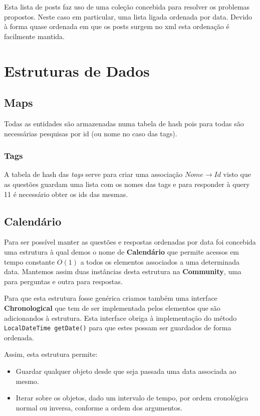 \documentclass[10pt,a4paper]{report}
\begin{document}
    Esta lista de posts faz uso de uma coleção concebida para resolver os 
    problemas propostos. Neste caso em particular, uma lista ligada ordenada 
    por data. Devido à forma quase ordenada em que os posts surgem no xml esta
    ordenação é facilmente mantida.


\chapter{Estruturas de Dados}
    \section{Maps}
        Todas as entidades são armazenadas numa tabela de hash pois para todas
        são necessárias pesquisas por id (ou nome no caso das tags).

        \subsection{Tags}
        A tabela de hash das \textit{tags} serve para criar uma associação
        $Nome \to Id$ visto que as questões guardam uma lista com os nomes das
        tags e para responder à query 11 é necessário obter os ids das mesmas.

    \section{Calendário}
        Para ser possível manter as questões e respostas ordenadas por data foi
        concebida uma estrutura à qual demos o nome de \textbf{Calendário} que
        permite acessos em tempo constante $O(1)$ a todos os elementos
        associados a uma determinada data. Mantemos assim duas instâncias desta 
        estrutura na \textbf{Community}, uma para perguntas e outra para respostas.

        Para que esta estrutura fosse genérica criamos também uma interface
        \textbf{Chronological} que tem de ser implementada pelos elementos
        que são adicionandos à estrutura. Esta interface obriga à implementação
        do método \texttt{LocalDateTime getDate()} para que estes possam
        ser guardados de forma ordenada.

        Assim, esta estrutura permite:
        \begin{itemize}
                \item Guardar qualquer objeto desde que seja
                      passada uma data associada ao mesmo.
                \item Iterar sobre os objetos, dado um intervalo de tempo,
                      por ordem cronológica normal ou inversa, conforme a
                      ordem dos argumentos.
        \end{itemize}
\end{document}
